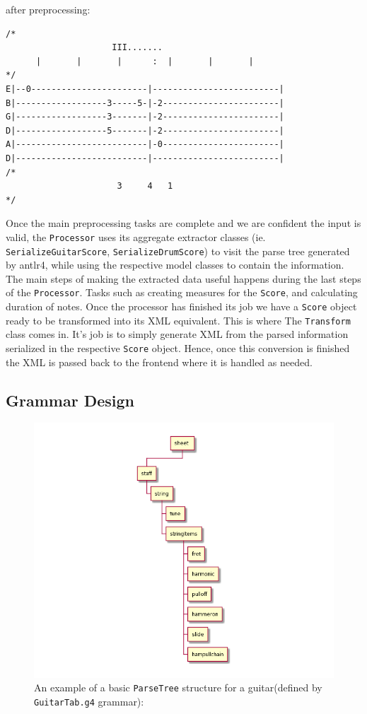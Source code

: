 \documentclass[11pt]{article}
\begin{document}
after preprocessing:
\begin{verbatim}
/*
	                 III.......
	  |       |       |      :  |       |       |
*/
E|--0-----------------------|-------------------------|
B|------------------3-----5-|-2-----------------------|
G|------------------3-------|-2-----------------------|
D|------------------5-------|-2-----------------------|
A|--------------------------|-0-----------------------|
D|--------------------------|-------------------------|
/*
	                  3     4   1
*/
\end{verbatim}

Once the main preprocessing tasks are complete and we are confident the input is valid, the \texttt{Processor} uses its aggregate extractor classes (ie. \texttt{SerializeGuitarScore}, \texttt{SerializeDrumScore}) to visit the parse tree generated by antlr4, while using the respective model classes to contain the information. The main steps of making the extracted data useful happens during the last steps of the \texttt{Processor}. Tasks such as creating measures for the \texttt{Score}, and calculating duration of notes. Once the processor has finished its job we have a \texttt{Score} object ready to be transformed into its XML equivalent. This is where The \texttt{Transform} class comes in. It's job is to simply generate XML from the parsed information serialized in the respective \texttt{Score} object. Hence, once this conversion is finished the XML is passed back to the frontend where it is handled as needed.

\newpage
\subsection{Grammar Design}
\label{sec:orgd59edca}
\begin{figure}[htbp]
\centering
\includegraphics[width=.9\linewidth]{./Diagrams/backend-guitar-grammar-diagram.png}
\caption{An example of a basic \texttt{ParseTree} structure for a guitar(defined by \texttt{GuitarTab.g4} grammar):}
\end{figure}
\end{document}
